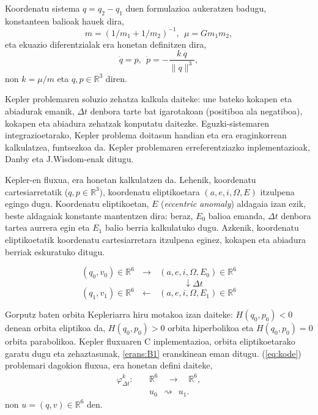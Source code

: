 Koordenatu sistema $q=q_2-q_1$ duen formulazioa aukeratzen badugu, konstanteen balioak hauek dira,  
\begin{equation*}
m=(1/m_1+1/m_2)^{-1},\ \ \mu=Gm_1m_2,
\end{equation*} 
%
eta ekuazio diferentzialak era honetan definitzen dira,
\begin{equation}
\label{eq:kode}
\dot{q}=p, \ \ \dot{p}= - \frac{k \ q}{\|q\|^3} ,
\end{equation}
non $k= \mu / m$ eta  $q,p \in \mathbb{R}^3$ diren.

Kepler problemaren soluzio zehatza kalkula daiteke: une bateko kokapen eta abiadurak emanik, $\Delta t$ denbora tarte bat igarotakoan (positiboa ala negatiboa), kokapen eta abiadura zehatzak konputatu daitezke. Eguzki-sistemaren integrazioetarako, Kepler problema doitasun handian eta era eraginkorrean kalkulatzea, funtsezkoa da. Kepler problemaren erreferentziazko inplementazioak, Danby \cite{Danby1992} eta J.Wisdom-enak  \cite{Wisdom2015} ditugu. 

Kepler-en fluxua, era honetan kalkulatzen da. Lehenik, koordenatu cartesiarretatik ($q,p\in \mathbb{R}^3$), koordenatu eliptikoetara $(a,e,i,\Omega,E)$ itzulpena egingo dugu. Koordenatu eliptikoetan, $E$ (\emph{eccentric anomaly}) aldagaia izan ezik, beste aldagaiak konstante mantentzen dira: beraz, $E_0$ balioa emanda, $\Delta t$ denbora tartea aurrera egin eta $E_1$ balio berria kalkulatuko dugu. Azkenik, koordenatu eliptikoetatik koordenatu cartesiarretara itzulpena eginez, kokapen eta abiadura berriak eskuratuko ditugu. 

\begin{equation*}
(q_0,v_0) \in \mathbb{R}^6 \ \ \ \longrightarrow \ \ \  (a,e,i,\Omega,E_0) \in \mathbb{R}^6 
\end{equation*}
\begin{equation*}
\quad \quad \quad \quad \quad \quad \quad \quad \downarrow \Delta t
\end{equation*}
\begin{equation*}
(q_1,v_1) \in \mathbb{R}^6 \ \ \ \longleftarrow \ \ \  (a,e,i,\Omega,E_1) \in \mathbb{R}^6 
\end{equation*}

Gorputz baten orbita Kepleriarra hiru motakoa izan daiteke: $H(q_0,p_0)<0$ denean orbita eliptikoa da, $H(q_0,p_0)>0$ orbita hiperbolikoa eta $H(q_0,p_0)=0$ orbita  parabolikoa. Kepler fluxuaren C inplementazioa, orbita eliptikoetarako garatu dugu eta zehaztasunak, \ref{erans:B1} eranskinean eman ditugu. (\ref{eq:kode}) problemari dagokion fluxua, era honetan defini daiteke,
\begin{align*}
\varphi_{\Delta t}^k:&  \quad \mathbb{R}^{6} \quad  \longrightarrow \quad \mathbb{R}^6,  \\
&  \quad u_0 \ \  \rightsquigarrow \ \ u_1. 
\end{align*} 
non $u=(q,v) \in \mathbb{R}^6$  den.

